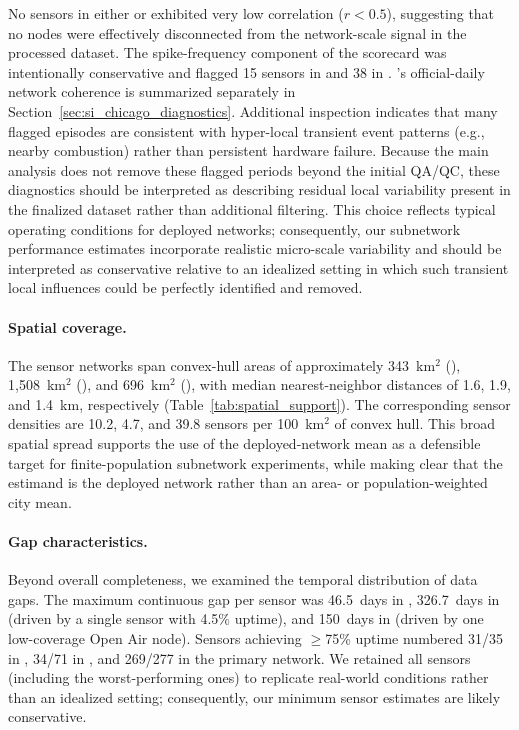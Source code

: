 \noindent No sensors in either  or  exhibited very low correlation ($r<0.5$), suggesting that no nodes were effectively disconnected from the network-scale signal in the processed dataset. The spike-frequency component of the scorecard was intentionally conservative and flagged 15 sensors in  and 38 in . 's official-daily network coherence is summarized separately in Section~\ref{sec:si_chicago_diagnostics}. Additional inspection indicates that many flagged episodes are consistent with hyper-local transient event patterns (e.g., nearby combustion) rather than persistent hardware failure. Because the main analysis does not remove these flagged periods beyond the initial QA/QC, these diagnostics should be interpreted as describing residual local variability present in the finalized dataset rather than additional filtering. This choice reflects typical operating conditions for deployed networks; consequently, our subnetwork performance estimates incorporate realistic micro-scale variability and should be interpreted as conservative relative to an idealized setting in which such transient local influences could be perfectly identified and removed.

\paragraph{Spatial coverage.}
The sensor networks span convex-hull areas of approximately 343~km$^2$ (), 1{,}508~km$^2$ (), and 696~km$^2$ (), with median nearest-neighbor distances of 1.6, 1.9, and 1.4~km, respectively (Table~\ref{tab:spatial_support}). The corresponding sensor densities are 10.2, 4.7, and 39.8 sensors per 100~km$^2$ of convex hull. This broad spatial spread supports the use of the deployed-network mean as a defensible target for finite-population subnetwork experiments, while making clear that the estimand is the deployed network rather than an area- or population-weighted city mean.

\paragraph{Gap characteristics.}
Beyond overall completeness, we examined the temporal distribution of data gaps. The maximum continuous gap per sensor was 46.5~days in , 326.7~days in  (driven by a single sensor with 4.5\% uptime), and 150~days in  (driven by one low-coverage Open Air node). Sensors achieving $\geq$75\% uptime numbered 31/35 in , 34/71 in , and 269/277 in the primary  network. We retained all sensors (including the worst-performing ones) to replicate real-world conditions rather than an idealized setting; consequently, our minimum sensor estimates are likely conservative.

